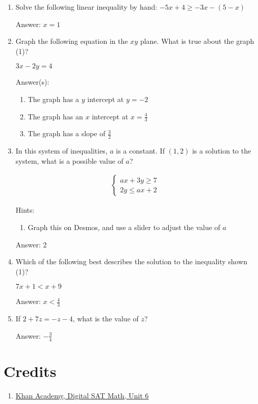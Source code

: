 \documentclass{article}
\begin{document}
\begin{enumerate}
{	      Answer: Quadrant III
	      }

	\item {Solve the following linear inequality by hand:
	      \(-5x+4\geq-3x-(5-x)\)

	      Answer: $x=1$}

	\item {Graph the following equation in the $xy$ plane. What is true about the graph (1)?

	      \(3x-2y=4\)

	      Answer(s): \begin{enumerate}
		      \item{The graph has a $y$ intercept at $y=-2$}
		      \item{The graph has an $x$ intercept at $x=\frac{4}{3}$}
		      \item{The graph has a slope of $\frac{3}{2}$}
	      \end{enumerate}}

	\item {In this system of inequalities, $a$ is a constant. If $(1,2)$ is a solution to the system, what is a possible value of $a$?

	      \[
		      \begin{array}{l}
			      \begin{cases}
				      ax+3y \geq 7 & \\
				      2y \leq ax+2
			      \end{cases}
		      \end{array}
	      \]

	      Hints:
	      \begin{enumerate}
		      \item{Graph this on Desmos, and use a slider to adjust the value of $a$}
	      \end{enumerate}

	      Answer: 2
	      }

	\item {Which of the following best describes the solution to the inequality shown (1)?

	      \(7x+1<x+9\)

	      Answer: $x<\frac{4}{3}$
	      }

	\item{If \(2+7z=-z-4\), what is the value of $z$?

	      Answer: $-\frac{3}{4}$}

\end{enumerate}

\section{Credits}
\begin{enumerate}

	\item{
	      \href{https://www.khanacademy.org/test-prep/v2-sat-math/x0fcc98a58ba3bea7:algebra-medium}{Khan Academy, Digital SAT Math, Unit 6}}

\end{enumerate}
\end{document}

